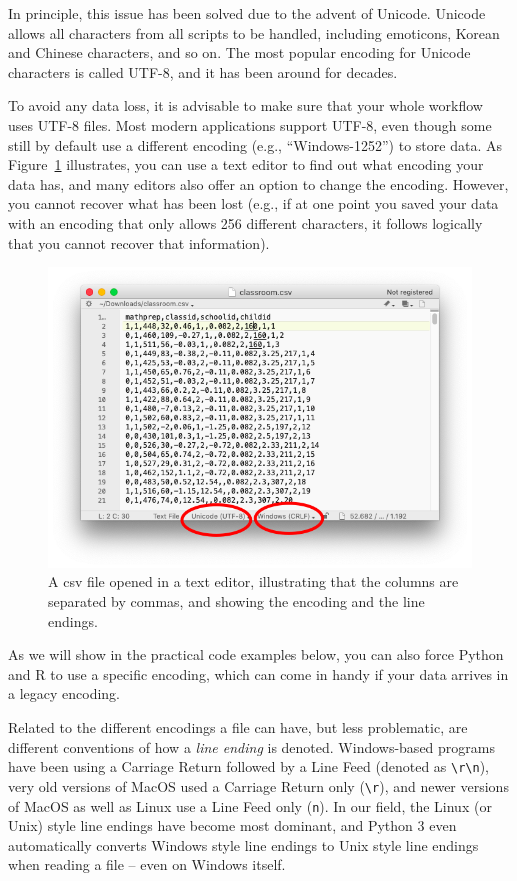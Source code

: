 In principle, this issue has been solved due to the advent of Unicode. Unicode allows all characters from all scripts to be handled, including emoticons, Korean and Chinese characters, and so on. The most popular encoding for Unicode characters is called UTF-8, and it has been around for decades.

To avoid any data loss, it is advisable to make sure that your whole workflow uses UTF-8 files. Most modern applications support UTF-8, even though some still by default use a different encoding (e.g., ``Windows-1252'') to store data. As Figure~\ref{fig:csv-in-editor} illustrates, you can use a text editor to find out what encoding your data has, and many editors also offer an option to change the encoding. However, you cannot recover what has been lost (e.g., if at one point you saved your data with an encoding that only allows 256 different characters, it follows logically that you cannot recover that information).


\begin{figure}
\centering
\includegraphics[width=0.9\linewidth]{figures/ch6_csv-in-editor.png}
\caption{A csv file opened in a text editor, illustrating that the columns are separated by commas, and showing the encoding and the line endings.}
\label{fig:csv-in-editor}
\end{figure}

As we will show in the practical code examples below, you can also force Python and R to use a specific encoding, which can come in handy if your data arrives in a legacy encoding.

Related to the different encodings a file can have, but less problematic, are different conventions of how a \emph{line ending} is denoted.
Windows-based programs have been using a Carriage Return followed by a Line Feed (denoted as \verb+\r\n+),
very old versions of MacOS used a Carriage Return only (\verb+\r+), and newer versions of MacOS as well as Linux use a Line Feed only (\verb+n+).
In our field, the Linux (or Unix) style line endings have become most dominant,
and Python 3 even automatically converts Windows style line endings to Unix style line endings when reading a file -- even on Windows itself.

